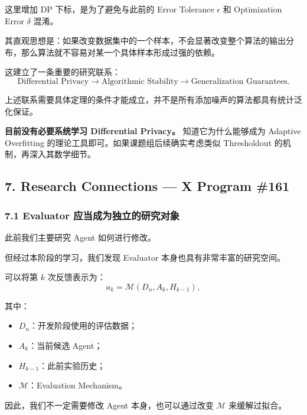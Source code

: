 这里增加 DP 下标，是为了避免与此前的 Error Tolerance \(\epsilon\) 和 Optimization Error \(\delta\) 混淆。

其直观思想是：如果改变数据集中的一个样本，不会显著改变整个算法的输出分布，那么算法就不容易对某一个具体样本形成过强的依赖。

这建立了一条重要的研究联系：
\[\text{Differential Privacy}
\longrightarrow
\text{Algorithmic Stability}
\longrightarrow
\text{Generalization Guarantees}.\]

上述联系需要具体定理的条件才能成立，并不是所有添加噪声的算法都具有统计泛化保证。

\textbf{目前没有必要系统学习 Differential Privacy。} 知道它为什么能够成为 Adaptive Overfitting 的理论工具即可。如果课题组后续确实考虑类似 Thresholdout 的机制，再深入其数学细节。

\hypertarget{part-2-20-0001-research-connections-x-program-161}{%
\subsection{7. Research Connections --- X Program \#161}\label{part-2-20-0001-research-connections-x-program-161}}

\hypertarget{part-2-20-0001-evaluator-ux5e94ux5f53ux6210ux4e3aux72ecux7acbux7684ux7814ux7a76ux5bf9ux8c61}{%
\subsubsection{7.1 Evaluator 应当成为独立的研究对象}\label{part-2-20-0001-evaluator-ux5e94ux5f53ux6210ux4e3aux72ecux7acbux7684ux7814ux7a76ux5bf9ux8c61}}

此前我们主要研究 Agent 如何进行修改。

但经过本阶段的学习，我们发现 Evaluator 本身也具有非常丰富的研究空间。

可以将第 \(k\) 次反馈表示为：
\[a_k=\mathcal M(D_n,A_k,H_{k-1}),\]

其中：

\begin{itemize}
\tightlist
\item
  \(D_n\)：开发阶段使用的评估数据；
\item
  \(A_k\)：当前候选 Agent；
\item
  \(H_{k-1}\)：此前实验历史；
\item
  \(\mathcal M\)：Evaluation Mechanism。
\end{itemize}

因此，我们不一定需要修改 Agent 本身，也可以通过改变 \(\mathcal M\) 来缓解过拟合。

